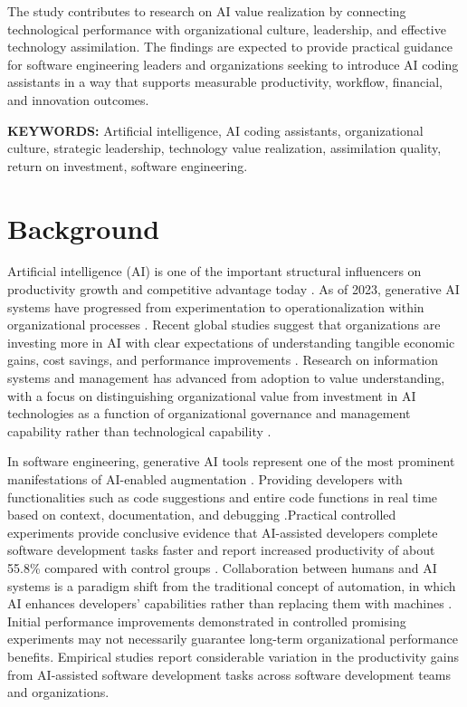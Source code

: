 \documentclass[11pt]{report}
\begin{document}
The study contributes to research on AI value realization by connecting technological performance with organizational culture, leadership, and effective technology assimilation. The findings are expected to provide practical guidance for software engineering leaders and organizations seeking to introduce AI coding assistants in a way that supports measurable productivity, workflow, financial, and innovation outcomes.

\textbf{KEYWORDS:} Artificial intelligence, AI coding assistants, organizational culture, strategic leadership, technology value realization, assimilation quality, return on investment, software engineering.

\chapter*{Background}

Artificial intelligence (AI) is one of the important structural influencers on productivity growth and competitive advantage today \autocite{Gillespie2025}. As of 2023, generative AI systems have progressed from experimentation to operationalization within organizational processes \autocite{Gillespie2025}. Recent global studies suggest that organizations are investing more in AI with clear expectations of understanding tangible economic gains, cost savings, and performance improvements \autocite{Gillespie2025}. Research on information systems and management has advanced from adoption to value understanding, with a focus on distinguishing organizational value from investment in AI technologies as a function of organizational governance and management capability rather than technological capability \autocite{Hossain2025}.

In software engineering, generative AI tools represent one of the most prominent manifestations of AI-enabled augmentation \autocite{Peng2023}. Providing developers with functionalities such as code suggestions and entire code functions in real time based on context, documentation, and debugging \autocite{Peng2023}.Practical controlled experiments provide conclusive evidence that AI-assisted developers complete software development tasks faster and report increased productivity of about 55.8\% compared with control groups \autocite{Peng2023}. Collaboration between humans and AI systems is a paradigm shift from the traditional concept of automation, in which AI enhances developers' capabilities rather than replacing them with machines \autocite{Peng2023}. Initial performance improvements demonstrated in controlled promising experiments may not necessarily guarantee long-term organizational performance benefits. Empirical studies report considerable variation in the productivity gains from AI-assisted software development tasks across software development teams and organizations.
\end{document}
